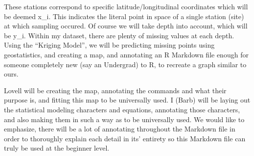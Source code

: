 \documentclass[
]{article}
\begin{document}
These stations correspond to specific latitude/longitudinal coordinates
which will be deemed x\_i. This indicates the literal point in space of
a single station (site) at which sampling occured. Of course we will
take depth into account, which will be y\_i. Within my dataset, there
are plenty of missing values at each depth. Using the ``Kriging Model'',
we will be predicting missing points using geostatistics, and creating a
map, and annotating an R Markdown file enough for someone completely new
(say an Undergrad) to R, to recreate a graph similar to ours.

Lovell will be creating the map, annotating the commands and what their
purpose is, and fitting this map to be universally used. I (Barb) will
be laying out the statistical modeling characters and equations,
annotating those characters, and also making them in such a way as to be
universally used. We would like to emphasize, there will be a lot of
annotating throughout the Markdown file in order to thoroughly explain
each detail in its' entirety so this Markdown file can truly be used at
the beginner level.
\end{document}
